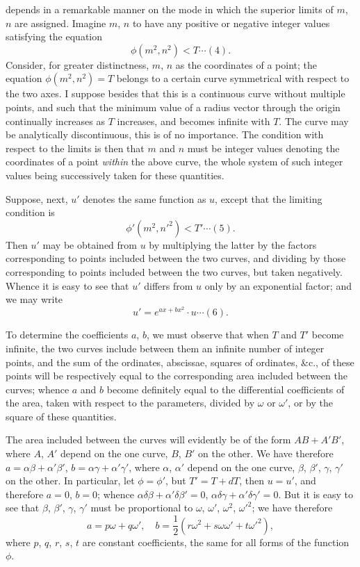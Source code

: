\documentclass[11pt,a4paper]{book}
\begin{document}
\newpage
\setcounter{page}{138}

depends in a remarkable manner on the mode in which the superior limits of $m$, $n$
are assigned. Imagine $m$, $n$ to have any positive or negative integer values satisfying the
equation
\[
\phi(m^2, n^2) < T \cdots (4).
\]
Consider, for greater distinctness, $m$, $n$ as the coordinates of a point; the equation
$\phi(m^2, n^2) = T$ belongs to a certain curve symmetrical with respect to the two axes.
I suppose besides that this is a continuous curve without multiple points, and such
that the minimum value of a radius vector through the origin continually increases as
$T$ increases, and becomes infinite with $T$. The curve may be analytically discontinuous,
this is of no importance. The condition with respect to the limits is then that $m$
and $n$ must be integer values denoting the coordinates of a point \textit{within} the above
curve, the whole system of such integer values being successively taken for these
quantities.

Suppose, next, $u'$ denotes the same function as $u$, except that the limiting condition is
\[
\phi'(m^2, n'^2) < T' \cdots (5).
\]
Then $u'$ may be obtained from $u$ by multiplying the latter by the factors corresponding
to points included between the two curves, and dividing by those corresponding to
points included between the two curves, but taken negatively. Whence it is easy to
see that $u'$ differs from $u$ only by an exponential factor; and we may write
\[
u' = e^{ax + bx^2} \cdot u \cdots (6).\]

\newpage
\setcounter{page}{139}

To determine the coefficients $a$, $b$, we must observe that when $T$ and $T'$ become
infinite, the two curves include between them an infinite number of integer points, and
the sum of the ordinates, abscissae, squares of ordinates, \&c., of these points will be
respectively equal to the corresponding area included between the curves; whence $a$
and $b$ become definitely equal to the differential coefficients of the area, taken with
respect to the parameters, divided by $\omega$ or $\omega'$, or by the square of these quantities.

The area included between the curves will evidently be of the form $AB + A'B'$,
where $A$, $A'$ depend on the one curve, $B$, $B'$ on the other. We have therefore
$a = \alpha\beta + \alpha'\beta'$, $b = \alpha\gamma + \alpha'\gamma'$, where $\alpha$, $\alpha'$ depend on the one curve, $\beta$, $\beta'$, $\gamma$, $\gamma'$
on the other. In particular, let $\phi = \phi'$, but $T' = T + dT$, then $u = u'$, and therefore
$a = 0$, $b = 0$; whence $\alpha\delta\beta + \alpha'\delta\beta' = 0$, $\alpha\delta\gamma + \alpha'\delta\gamma' = 0$. But it is easy to see that
$\beta$, $\beta'$, $\gamma$, $\gamma'$ must be proportional to $\omega$, $\omega'$, $\omega^2$, $\omega'^2$; we have therefore
\[
a = p\omega + q\omega',\quad b = \frac{1}{2}(r\omega^2 + s\omega\omega' + t\omega'^2),
\]
where $p$, $q$, $r$, $s$, $t$ are constant coefficients, the same for all forms of the function $\phi$.
\end{document}
